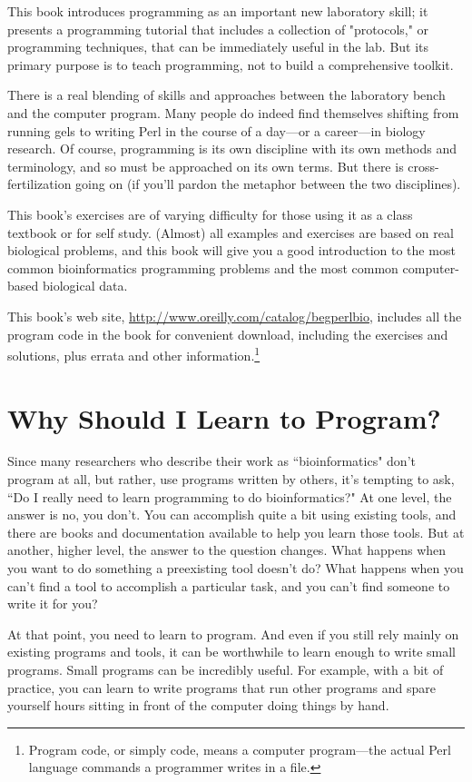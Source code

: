 This book introduces programming as an important new laboratory skill; it presents a programming tutorial that includes a collection of "protocols," or programming techniques, that can be immediately useful in the lab. But its primary purpose is to teach programming, not to build a comprehensive toolkit.

There is a real blending of skills and approaches between the laboratory bench and the computer program. Many people do indeed find themselves shifting from running gels to writing Perl in the course of a day—or a career—in biology research. Of course, programming is its own discipline with its own methods and terminology, and so must be approached on its own terms. But there is cross-fertilization going on (if you'll pardon the metaphor between the two disciplines).

This book's exercises are of varying difficulty for those using it as a class textbook or for self study. (Almost) all examples and exercises are based on real biological problems, and this book will give you a good introduction to the most common bioinformatics programming problems and the most common computer-based biological data.

This book's web site, \href{http://www.oreilly.com/catalog/begperlbio}{http://www.oreilly.com/catalog/begperlbio}, includes all the program code in the book for convenient download, including the exercises and solutions, plus errata and other information.\footnote{Program code, or simply code, means a computer program—the actual Perl language commands a programmer writes in a file.}

\section*{Why Should I Learn to Program?}
Since many researchers who describe their work as ``bioinformatics" don't program at all, but rather, use programs written by others, it's tempting to ask, ``Do I really need to learn programming to do bioinformatics?" At one level, the answer is no, you don't. You can accomplish quite a bit using existing tools, and there are books and documentation available to help you learn those tools. But at another, higher level, the answer to the question changes. What happens when you want to do something a preexisting tool doesn't do? What happens when you can't find a tool to accomplish a particular task, and you can't find someone to write it for you?

At that point, you need to learn to program. And even if you still rely mainly on existing programs and tools, it can be worthwhile to learn enough to write small programs. Small programs can be incredibly useful. For example, with a bit of practice, you can learn to write programs that run other programs and spare yourself hours sitting in front of the computer doing things by hand.

